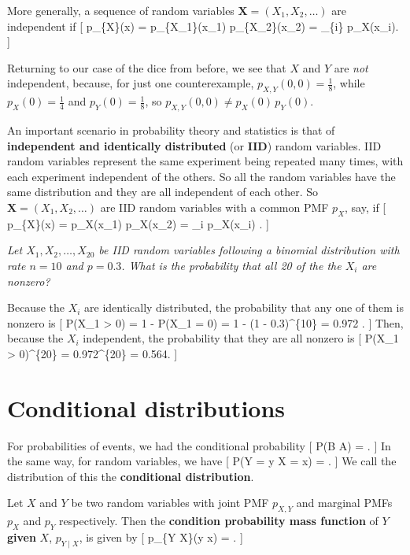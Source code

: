 \documentclass[
  letterpaper,
  DIV=11,
  numbers=noendperiod]{scrreprt}
\theoremstyle{remark}
\begin{document}
More generally, a sequence of random variables
\(\mathbf X = (X_1, X_2, \dots)\) are independent if {[}
p\_\{\mathbf X\}(\mathbf x) = p\_\{X\_1\}(x\_1) \times p\_\{X\_2\}(x\_2)
\times \cdots = \prod\_\{i\} p\_X(x\_i). {]}

Returning to our case of the dice from before, we see that \(X\) and
\(Y\) are \emph{not} independent, because, for just one counterexample,
\(p_{X,Y}(0,0) = \frac18\), while \(p_X(0) = \frac14\) and
\(p_Y(0) = \frac18\), so \(p_{X,Y}(0,0) \neq p_X(0) \, p_Y(0)\).

An important scenario in probability theory and statistics is that of
\textbf{independent and identically distributed} (or \textbf{IID})
random variables. IID random variables represent the same experiment
being repeated many times, with each experiment independent of the
others. So all the random variables have the same distribution and they
are all independent of each other. So \(\mathbf X = (X_1, X_2, \dots )\)
are IID random variables with a common PMF \(p_X\), say, if {[}
p\_\{\mathbf X\}(\mathbf x) = p\_X(x\_1) \times p\_X(x\_2)
\times \cdots = \prod\_i p\_X(x\_i) . {]}

\emph{Let \(X_1, X_2, \dots, X_{20}\) be IID random variables following
a binomial distribution with rate \(n = 10\) and \(p = 0.3\). What is
the probability that all 20 of the the \(X_i\) are nonzero?}

Because the \(X_i\) are identically distributed, the probability that
any one of them is nonzero is {[} \mathbb P(X\_1 \textgreater{} 0) = 1 -
\mathbb P(X\_1 = 0) = 1 - (1 - 0.3)\^{}\{10\} = 0.972 . {]} Then,
because the \(X_i\) independent, the probability that they are all
nonzero is {[} \mathbb P(X\_1 \textgreater{} 0)\^{}\{20\} =
0.972\^{}\{20\} = 0.564. {]}

\hypertarget{cond-rv}{%
\section{Conditional distributions}\label{cond-rv}}

For probabilities of events, we had the conditional probability {[}
\mathbb P(B \mid A) =  . {]} In
the same way, for random variables, we have {[} \mathbb P(Y = y \mid X =
x) =  . {]}
We call the distribution of this the \textbf{conditional distribution}.

Let \(X\) and \(Y\) be two random variables with joint PMF \(p_{X,Y}\)
and marginal PMFs \(p_X\) and \(p_Y\) respectively. Then the
\textbf{condition probability mass function} of \(Y\) \textbf{given}
\(X\), \(p_{Y \mid X}\), is given by {[} p\_\{Y \mid X\}(y \mid x) =
 . {]}
\end{document}

